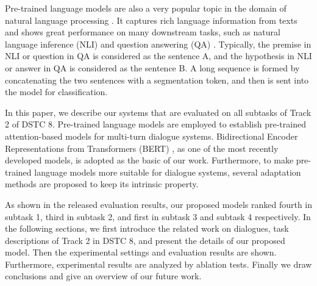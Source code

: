 \documentclass[letterpaper]{article} \usepackage{aaai20}  \usepackage{times}  \usepackage{helvet} \usepackage{courier}  \usepackage[hyphens]{url}  \usepackage{graphicx} \urlstyle{rm} \def\UrlFont{\rm}  \usepackage{graphicx}  \frenchspacing  \setlength{\pdfpagewidth}{8.5in}  \setlength{\pdfpageheight}{11in}
\begin{document}
  Pre-trained language models are also a very popular topic in the domain of natural language processing \cite{DBLP:conf/naacl/PetersNIGCLZ18,DBLP:conf/naacl/DevlinCLT19,DBLP:journals/corr/abs-1906-08237}.
  It captures rich language information from texts and shows great performance on many downstream tasks, such as natural language inference (NLI) \cite{DBLP:conf/emnlp/BowmanAPM15} and question answering (QA) \cite{DBLP:conf/emnlp/RajpurkarZLL16}.
  Typically, the premise in NLI or question in QA is considered as the sentence A, and the hypothesis in NLI or answer in QA is considered as the sentence B.
  A long sequence is formed by concatenating the two sentences with a segmentation token, and then is sent into the model for classification.

  In this paper, we describe our systems that are evaluated on all subtasks of Track 2 of DSTC 8.
  Pre-trained language models are employed to establish pre-trained attention-based models for multi-turn dialogue systems.
  Bidirectional Encoder Representations from Transformers (BERT) \cite{DBLP:conf/naacl/DevlinCLT19}, as one of the most recently developed models, is adopted as the basic of our work.
  Furthermore, to make pre-trained language models more suitable for dialogue systems, several adaptation methods are proposed to keep its intrinsic property.

  As shown in the released evaluation results, our proposed models ranked fourth in subtask 1, third in subtask 2, and first in subtask 3 and subtask 4 respectively.
  In the following sections, we first introduce the related work on dialogues, task descriptions of Track 2 in DSTC 8, and present the details of our proposed model.
  Then the experimental settings and evaluation results are shown.
  Furthermore, experimental results are analyzed by ablation tests.
  Finally we draw conclusions and give an overview of our future work.

  \begin{table*}[t]\small
    \centering
    \caption{Task description of each subtask in Track 2.}
    \label{tab1}
  \end{table*}
\end{document}
